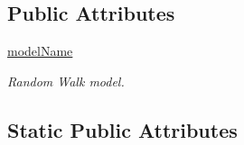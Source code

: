 \subsection*{Public Attributes}
\begin{DoxyCompactItemize}
\item 
\hyperlink{classmininet_1_1wifiMobility_1_1mobility_a3eddb97d5e1bd75aa2fb5246204329aa}{model\-Name}
\begin{DoxyCompactList}\small\item\em Random Walk model. \end{DoxyCompactList}\end{DoxyCompactItemize}
\subsection*{Static Public Attributes}
